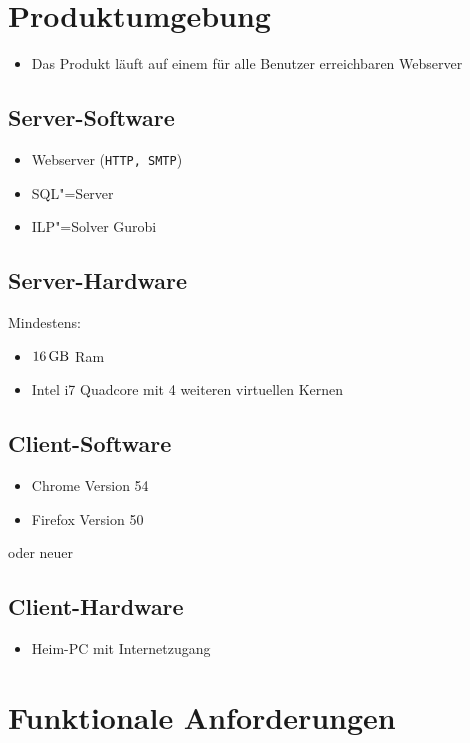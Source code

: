\documentclass[parskip=full]{scrartcl}
\begin{document}
\section{Produktumgebung}

\begin{itemize} 
  \item Das Produkt läuft auf einem für alle Benutzer erreichbaren Webserver
\end{itemize}
\subsection{Server-Software}
\begin{itemize} 
  \item Webserver (\texttt{HTTP, SMTP})
  \item SQL"=Server
  \item ILP"=Solver Gurobi %
\end{itemize}
\subsection{Server-Hardware}
Mindestens:
\begin{itemize} 
  \item $\SI{16}{\giga\byte}$ Ram
  \item Intel i7 Quadcore mit 4 weiteren virtuellen Kernen 
\end{itemize}

\subsection{Client-Software}
\begin{itemize}
  \item Chrome Version 54
  \item Firefox Version 50
\end{itemize}
oder neuer
\subsection{Client-Hardware}
\begin{itemize}
  \item Heim-PC mit Internetzugang %
\end{itemize}
\section{Funktionale Anforderungen}
\end{document}
